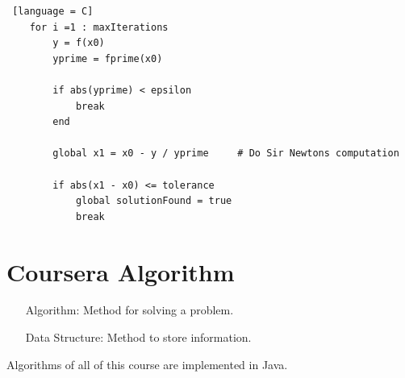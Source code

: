 \documentclass[10 pt]{book}
\begin{document}
\begin{enumerate}
\begin{lstlisting} [language = C]
	for i =1 : maxIterations
		y = f(x0)
		yprime = fprime(x0)
		
		if abs(yprime) < epsilon
			break
		end
		
		global x1 = x0 - y / yprime		# Do Sir Newtons computation
		
		if abs(x1 - x0) <= tolerance
			global solutionFound = true
			break
\end{lstlisting}

\chapter{Coursera Algorithm}
\begin{itemize}
	\item[Algorithm: ] Method for solving a problem.
	\item[Data Structure: ] Method to store information.
\end{itemize}
Algorithms of all of this course are implemented in Java.


\end{enumerate}
\end{document}
